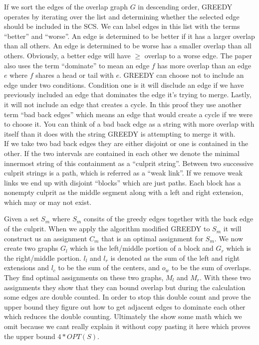 \documentclass[letterpaper,11pt,titlepage]{article}
\begin{document}
If we sort the edges of the overlap graph $G$ in descending order, GREEDY operates by iterating over the list and determining whether the selected edge should be included in the SCS. We can label edges in this list with the terms ``better'' and ``worse''. An edge is determined to be better if it has a larger overlap than all others. An edge is determined to be worse has a smaller overlap than all others. Obviously, a better edge will have $\geq$ overlap to a worse edge. The paper also uses the term ``dominate'' to mean an edge $f$ has more overlap than an edge $e$ where $f$ shares a head or tail with $e$. GREEDY can choose not to include an edge under two conditions. Condition one is it will disclude an edge if we have previously included an edge that dominates the edge it's trying to merge. Lastly, it will not include an edge that creates a cycle. In this proof they use another term ``bad back edges'' which means an edge that would create a cycle if we were to choose it. You can think of a bad back edge as a string with more overlap with itself than it does with the string GREEDY is attempting to merge it with.\\

If we take two bad back edges they are either disjoint or one is contained in the other. If the two intervals are contained in each other we denote the minimal innermost string of this containment as a ``culprit string''. Between two successive culprit strings is a path, which is referred as a ``weak link''. If we remove weak links we end up with disjoint ``blocks'' which are just paths. Each block has a nonempty culprit as the middle segment along with a left and right extension, which may or may not exist.

Given a set $S_m$ where $S_m$ consits of the greedy edges together with the back edge of the culprit. When we apply the algorithm modified GREEDY to $S_m$ it will construct us an assignment $C_m$ that is an optimal assignment for $S_m$. We now create two graphs $G_l$ which is the left/middle portion of a block and $G_r$ which is the right/middle portion. $l_l$ and $l_r$ is denoted as the sum of the left and right extensions and $l_c$ to be the sum of the centers, and $o_w$ to be the sum of overlaps. They find optimal assignments on these two graphs, $M_l$ and $M_r$. With these two assignments they show that they can bound overlap but during the calculation some edges are double counted. In order to stop this double count and prove the upper bound they figure out how to get adjacent edges to dominate each other which reduces the double counting. Ultimately the show some math which we omit because we cant really explain it without copy pasting it here which proves the upper bound $4 * OPT(S)$.
\end{document}
